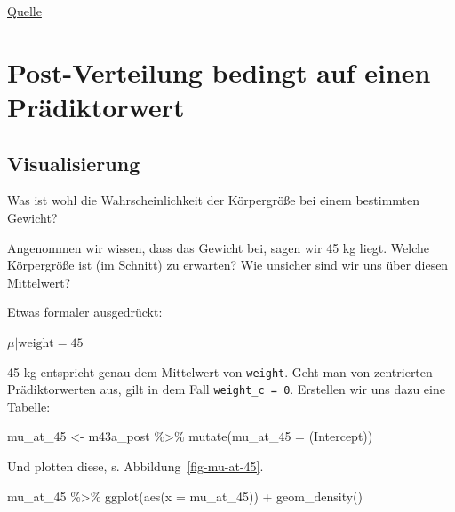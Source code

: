 \documentclass[
  a4paper,
  DIV=11]{scrreprt}
\newenvironment{Shaded}{\begin{snugshade}}{\end{snugshade}}
\newcommand{\AttributeTok}[1]{\textcolor[rgb]{0.40,0.45,0.13}{#1}}
\newcommand{\FunctionTok}[1]{\textcolor[rgb]{0.28,0.35,0.67}{#1}}
\newcommand{\NormalTok}[1]{\textcolor[rgb]{0.00,0.23,0.31}{#1}}
\newcommand{\OtherTok}[1]{\textcolor[rgb]{0.00,0.23,0.31}{#1}}
\newcommand{\SpecialCharTok}[1]{\textcolor[rgb]{0.37,0.37,0.37}{#1}}
\newcommand{\StringTok}[1]{\textcolor[rgb]{0.13,0.47,0.30}{#1}}
\theoremstyle{definition}
\theoremstyle{remark}
\begin{document}
\href{https://easystats.github.io/bayestestR/articles/bayestestR.html}{Quelle}

\hypertarget{post-verteilung-bedingt-auf-einen-pruxe4diktorwert}{%
\section{Post-Verteilung bedingt auf einen
Prädiktorwert}\label{post-verteilung-bedingt-auf-einen-pruxe4diktorwert}}

\hypertarget{visualisierung}{%
\subsection{Visualisierung}\label{visualisierung}}

Was ist wohl die Wahrscheinlichkeit der Körpergröße bei einem bestimmten
Gewicht?

Angenommen wir wissen, dass das Gewicht bei, sagen wir 45 kg liegt.
Welche Körpergröße ist (im Schnitt) zu erwarten? Wie unsicher sind wir
uns über diesen Mittelwert?

Etwas formaler ausgedrückt:

\(\mu|\text{weight}=45\)

45 kg entspricht genau dem Mittelwert von \texttt{weight}. Geht man von
zentrierten Prädiktorwerten aus, gilt in dem Fall
\texttt{weight\_c\ =\ 0}. Erstellen wir uns dazu eine Tabelle:

\begin{Shaded}
\begin{Highlighting}[]
\NormalTok{mu\_at\_45 }\OtherTok{\textless{}{-}}
\NormalTok{  m43a\_post }\SpecialCharTok{\%\textgreater{}\%} 
  \FunctionTok{mutate}\NormalTok{(}\AttributeTok{mu\_at\_45 =} \StringTok{\textasciigrave{}}\AttributeTok{(Intercept)}\StringTok{\textasciigrave{}}\NormalTok{)}
\end{Highlighting}
\end{Shaded}

Und plotten diese, s. Abbildung~\ref{fig-mu-at-45}.

\begin{Shaded}
\begin{Highlighting}[]
\NormalTok{mu\_at\_45 }\SpecialCharTok{\%\textgreater{}\%} 
  \FunctionTok{ggplot}\NormalTok{(}\FunctionTok{aes}\NormalTok{(}\AttributeTok{x =}\NormalTok{ mu\_at\_45)) }\SpecialCharTok{+}
  \FunctionTok{geom\_density}\NormalTok{()}
\end{Highlighting}
\end{Shaded}
\end{document}
